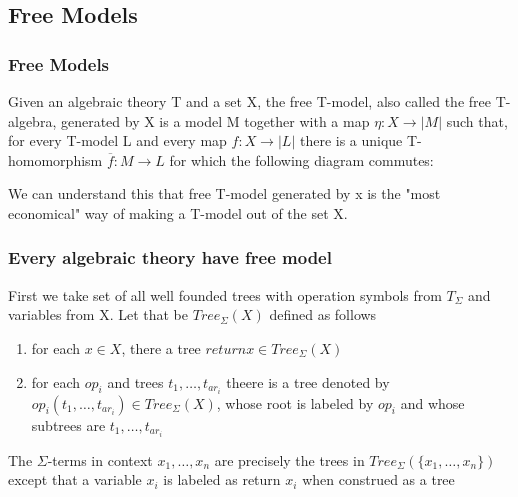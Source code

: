 \documentclass{beamer}
\begin{document}
\subsection{Free Models}
\begin{frame}
    \frametitle{Free Models}
    \begin{definition}
        Given an
        algebraic theory T and a set X, the free T-model, also called the free T-algebra, generated
        by X is a model M together with a map $\eta : X \rightarrow |M|$ such that, for every T-model L and
        every map $f : X \rightarrow |L|$ there is a unique T-homomorphism $\overline{f} : M \rightarrow L$ for which the
        following diagram commutes:
    
    
        \begin{center}
            \end{center}    
    
            We can understand this that free T-model generated by x is the "most economical"
            way of making a T-model out of the set X.
    \end{definition}
\end{frame}

\begin{frame}
    \frametitle{Every algebraic theory have free model}
    First we take set of all well founded trees with operation symbols from $T_\Sigma$ and variables 
    from X. Let that be $Tree_\Sigma(X)$ defined as follows 
    \begin{enumerate}
        \item for each $x \in X$, there a tree $return x \in Tree_\Sigma(X)$
        \item for each $op_i$ and trees $t_1, \ldots, t_{ar_i}$ theere is a tree denoted by 
        $op_i(t_1, \ldots, t_{ar_i}) \in Tree_\Sigma(X)$, whose root is labeled by $op_i$ and whose
        subtrees are $t_1, \ldots, t_{ar_i}$
    \end{enumerate}
    The $\Sigma$-terms in context $x_1, \ldots, x_n$ are precisely the trees in $Tree_\Sigma(\{x_1, \ldots, x_n\})$
    except that a variable $x_i$ is labeled as return $x_i$ when construed as a tree
\end{frame}
\end{document}
